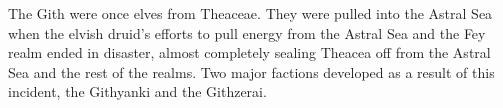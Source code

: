 The Gith were once elves from Theaceae.
They were pulled into the Astral Sea when the elvish druid's efforts to pull energy from the Astral Sea and the Fey realm ended in disaster, almost completely sealing Theacea off from the Astral Sea and the rest of the realms.
Two major factions developed as a result of this incident, the Githyanki and the Githzerai.
